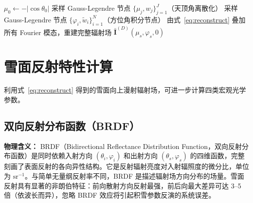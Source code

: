 \documentclass[UTF8,a4paper,12pt]{ctexart}
\begin{document}
\begin{algorithm}[htbp]
\caption{矢量辐射传输方程特征值法求解}
\label{alg:vrt}
$\mu_0\leftarrow-|\cos\theta_0|$ 
采样 Gauss-Legendre 节点 $\{\mu_j,w_j\}_{j=1}^{J}$（天顶角离散化）\;
采样 Gauss-Legendre 节点 $\{\varphi_i,\tilde{w}_i\}_{i=1}^{N}$（方位角积分节点）\;
由式~\eqref{eq:reconstruct} 叠加所有 Fourier 模态，重建完整辐射场\;
\Return $\bar{\mathbf{I}}^{(D)}(\mu_s,\varphi_s,0)$
\end{algorithm}


\section{雪面反射特性计算}
\label{sec:reflectance}

利用式~\eqref{eq:reconstruct} 得到的雪面向上漫射辐射场，可进一步计算四类宏观光学参数。

\subsection{双向反射分布函数（BRDF）}

\textbf{物理含义：}
BRDF（Bidirectional Reflectance Distribution Function，双向反射分布函数）是同时依赖入射方向 $(\theta_i,\varphi_i)$ 和出射方向 $(\theta_s,\varphi_s)$ 的四维函数，完整刻画了表面反射的各向异性结构。它是反射辐射亮度对入射辐照度的微分比，单位为 $\mathrm{sr}^{-1}$。与简单无量纲反射率不同，BRDF 是描述辐射场方向分布的场量。雪面反射具有显著的非朗伯特征：前向散射方向反射最强，前后向最大差异可达 3--5 倍（依波长而异），忽略 BRDF 效应将引起积雪参数反演的系统误差。
\end{document}
